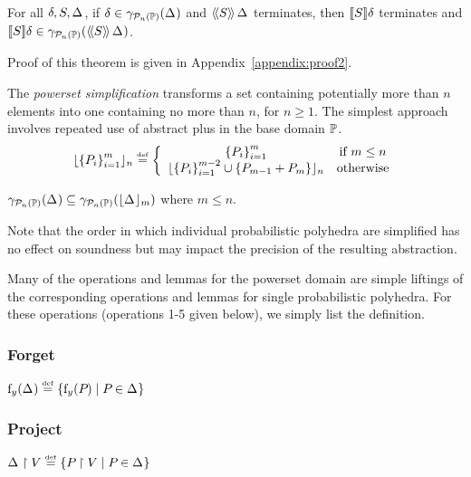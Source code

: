 \begin{theorem} \label{thm:ppp:soundness}
For all $\delta, S, \Delta_{}$, if $\delta \in \gamma_{\mathcal{P}_{n}\left( \mathbb{P} \right)}(\Delta_{})$ and $
\langle\!\langle{S}\rangle\!\rangle\,{\Delta_{}} $ terminates, then $ [\![{S}]\!]{\delta} $ terminates and
$[\![{S}]\!]{\delta} \in
\gamma_{\mathcal{P}_{n}\left( \mathbb{P} \right)}(\langle\!\langle{S}\rangle\!\rangle\,{\Delta_{}})$.
\end{theorem}

\iffull
Proof of this theorem is given in Appendix~\ref{appendix:proof2}.
\fi

\begin{definition}
\label{def:ppp-simp}
The \emph{powerset simplification} transforms a
  set containing potentially more than $ n $ elements into one
  containing no more than $ n $, for $n \geq 1$. The simplest approach involves repeated use
  of abstract plus in the base domain $ \mathbb{P} $.
$$
\lfloor \left\{ P_{i} \right\}_{i=1}^{m} \rfloor_{n} \stackrel{\smash{\scriptscriptstyle \mathrm{def}}}= \left\{
\begin{array}{cc}
\left\{ P_{i} \right\}_{i=1}^{m} & \text{if } m \leq n \\
\lfloor \left\{ P_{i} \right\}_{i=1}^{m-2} \cup \left\{ P_{m-1} + P_{m} \right\} \rfloor_{n} & \text{otherwise} \\
\end{array}
\right.
$$
\end{definition}

\begin{lemma}
\label{lem:ppp:bound}
$ \gamma_{\mathcal{P}_{n}\left( \mathbb{P} \right)}(\Delta_{}) \subseteq \gamma_{\mathcal{P}_{n}\left( \mathbb{P} \right)}(
    \lfloor \Delta_{} \rfloor_{m}) $ where $m \leq n$.
\end{lemma}

Note that the order in which individual probabilistic
polyhedra are simplified has no effect on soundness but may impact the
precision of the resulting abstraction.

Many of the operations and lemmas for the powerset domain are simple liftings
of the corresponding operations and lemmas for single probabilistic polyhedra.
For these operations (operations 1-5 given below), we simply list the
definition.

\subsubsection{Forget} $ \mathrm{f}_{y}(\Delta_{}) \stackrel{\smash{\scriptscriptstyle \mathrm{def}}}=
\left\{ \mathrm{f}_{y}(P_{}) \mid P_{} \in \Delta_{} \right\} $

\subsubsection{Project} $ \Delta_{} \upharpoonright V \stackrel{\smash{\scriptscriptstyle \mathrm{def}}}=
\left\{ P_{} \upharpoonright V \mid P_{} \in \Delta_{} \right\} $

